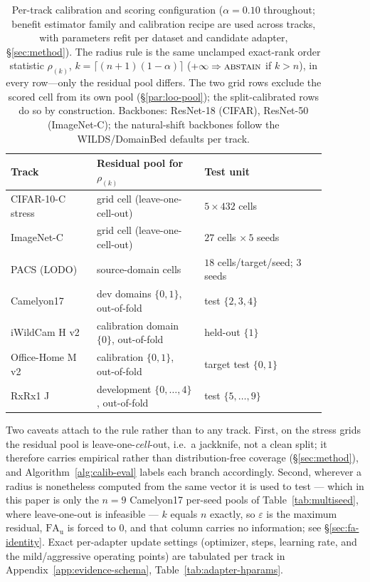 \begin{table}[t]\centering\scriptsize
\caption{Per-track calibration and scoring configuration ($\alpha{=}0.10$ throughout; benefit
estimator family and calibration recipe are used across tracks, with parameters refit per dataset and candidate adapter, \S\ref{sec:method}). The radius rule is the same unclamped exact-rank order statistic
$\rho_{(k)}$, $k=\lceil(n{+}1)(1-\alpha)\rceil$ ($+\infty\Rightarrow\textsc{abstain}$ if $k>n$), in
every row---only the residual pool
differs. The two grid rows exclude the scored cell from its own pool
(\S\ref{par:loo-pool}); the split-calibrated rows do so by construction. Backbones: ResNet-18 (CIFAR), ResNet-50
(ImageNet-C); the natural-shift backbones follow the WILDS/DomainBed defaults per track.}
\label{tab:config-table}
\begin{tabular}{@{}p{0.24\linewidth}p{0.30\linewidth}p{0.34\linewidth}@{}}
\toprule
Track & Residual pool for $\rho_{(k)}$ & Test unit \\
\midrule
CIFAR-10-C stress & grid cell (leave-one-cell-out) & $5{\times}432$ cells \\
ImageNet-C & grid cell (leave-one-cell-out) & $27$ cells $\times\,5$ seeds \\
PACS (LODO) & source-domain cells & $18$ cells/target/seed; $3$ seeds \\
Camelyon17 & dev domains $\{0,1\}$, out-of-fold & test $\{2,3,4\}$ \\
iWildCam H v2 & calibration domain $\{0\}$, out-of-fold & held-out $\{1\}$ \\
Office-Home M v2 & calibration $\{0,1\}$, out-of-fold & target test $\{0,1\}$ \\
RxRx1 J & development $\{0,\ldots,4\}$, out-of-fold & test $\{5,\ldots,9\}$ \\
\bottomrule
\end{tabular}
\end{table}
Two caveats attach to the rule rather than to any track. First, on the stress grids the residual pool
is leave-one-\emph{cell}-out, i.e.\ a jackknife, not a clean split; it therefore carries empirical
rather than distribution-free coverage (\S\ref{sec:method}), and Algorithm~\ref{alg:calib-eval} labels
each branch accordingly. Second, wherever a radius is nonetheless computed from the same vector it is
used to test --- which in this paper is only the $n{=}9$ Camelyon17 per-seed pools of
Table~\ref{tab:multiseed}, where leave-one-out is infeasible --- $k$ equals $n$ exactly, so
$\varepsilon$ is the maximum residual, $\mathrm{FA}_{\mathrm u}$ is forced to $0$, and that column
carries no information; see \S\ref{sec:fa-identity}.
Exact per-adapter update settings (optimizer, steps, learning rate, and the mild/aggressive
operating points) are tabulated per track in Appendix~\ref{app:evidence-schema},
Table~\ref{tab:adapter-hparams}.

